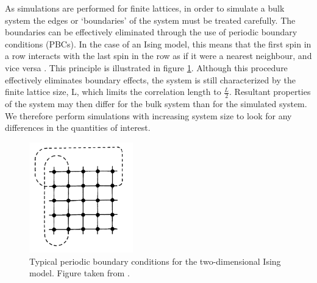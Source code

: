 As simulations are performed for finite lattices, in order to simulate a bulk system the edges or `boundaries' of the system must be treated carefully. The boundaries can be effectively eliminated through the use of periodic boundary conditions (PBCs). In the case of an Ising model, this means that the first spin in a row interacts with the last spin in the row as if it were a nearest neighbour, and vice versa \cite{MC_Landau}. This principle is illustrated in figure \ref{MC_PBCs}. Although this procedure effectively eliminates boundary effects, the system is still characterized by the finite lattice size, L, which limits the correlation length to $\frac{L}{2}$. Resultant properties of the system may then differ for the bulk system than for the simulated system. We therefore perform simulations with increasing system size to look for any differences in the quantities of interest.

\begin{figure}[h!]
  \centering
    \includegraphics[width=0.4\textwidth]{figures/MC_PBCs.png}
    \caption{Typical periodic boundary conditions for the two-dimensional Ising model. Figure taken from .}
  \label{MC_PBCs}
\end{figure}

